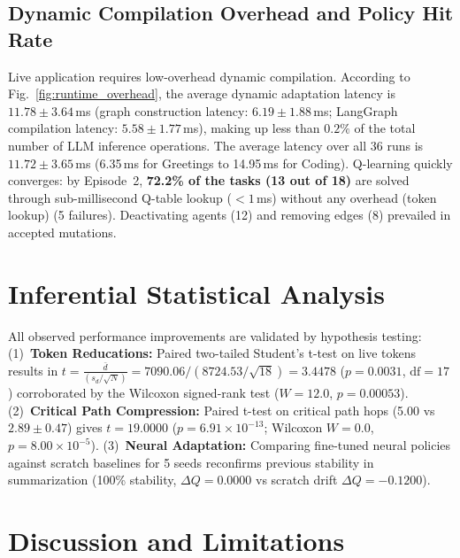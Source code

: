 ﻿\documentclass[conference]{IEEEtran}
\begin{document}
\subsection{Dynamic Compilation Overhead and Policy Hit Rate}
Live application requires low-overhead dynamic compilation. According to Fig.~\ref{fig:runtime_overhead}, the average dynamic adaptation latency is $\mathbf{11.78 \pm 3.64}$\,ms (graph construction latency: $6.19 \pm 1.88$\,ms; LangGraph compilation latency: $5.58 \pm 1.77$\,ms), making up less than $0.2\%$ of the total number of LLM inference operations. The average latency over all 36 runs is $11.72 \pm 3.65$\,ms (6.35\,ms for Greetings to 14.95\,ms for Coding). Q-learning quickly converges: by Episode~2, \textbf{72.2\% of the tasks (13 out of 18)} are solved through sub-millisecond Q-table lookup ($<1$\,ms) without any overhead (token lookup) (5 failures). Deactivating agents (12) and removing edges (8) prevailed in accepted mutations.

\section{Inferential Statistical Analysis}
\label{sec:statistical_analysis}

All observed performance improvements are validated by hypothesis testing:
(1)~\textbf{Token Reducations:} Paired two-tailed Student's t-test on live tokens results in $t = \frac{\bar{d}}{(s_d/\sqrt{N})} = 7090.06 / (8724.53/\sqrt{18}) = \mathbf{3.4478}$ ($p = 0.0031$, $\mathrm{df}=17$) corroborated by the Wilcoxon signed-rank test ($W = 12.0$, $p = 0.00053$).
(2)~\textbf{Critical Path Compression:} Paired t-test on critical path hops (5.00 vs $\mathbf{2.89 \pm 0.47}$) gives $t = \mathbf{19.0000}$ ($p = 6.91 \times 10^{-13}$; Wilcoxon $W = 0.0$, $p = 8.00 \times 10^{-5}$).
(3)~\textbf{Neural Adaptation:} Comparing fine-tuned neural policies against scratch baselines for 5 seeds reconfirms previous stability in summarization (100\% stability, $\Delta Q = 0.0000$ vs scratch drift $\Delta Q = -0.1200$).

\section{Discussion and Limitations}
\label{sec:discussion}
\end{document}
